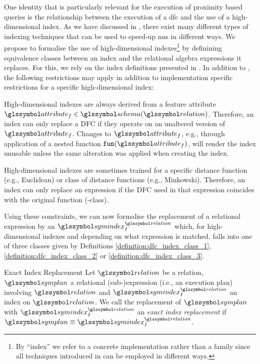 One identity that is particularly relevant for the execution of proximity based queries is the relationship between the execution of a \acrshort{dfc} and the use of a high-dimensional index. As we have discussed in , there exist many different types of indexing techniques that can be used to speed-up \acrshort{nns} in different ways. We propose to formalise the use of high-dimensional indexes\footnote{By ``index'' we refer to a concrete implementation rather than a family since all techniques introduced in  can be employed in different ways.} by definining equivalence classes between an index and the relational algebra expressions it replaces. For this, we rely on the index definitions presented in . In addition to , the following restrictions may apply in addition to implementation specific restrictions for a specific high-dimensional index: 
\begin{enumerate*}[label=(\roman*)]
    \item High-dimensional indexes are always derived from a feature attribute $\attribute_f \in \schema(\relation)$. Therefore, an index can only replace a DFC if they operate on an unaltered version of $\attribute_f$. Changes to $\attribute_f$, e.g., through application of a nested function $\mathtt{fun}(\attribute_f)$, will render the index unusable unless the same alteration was applied when creating the index.
    \item High-dimensional indexes are sometimes trained for a specific distance function (e.g., Euclidean) or class of distance functions (e.g., Minkowski). Therefore, an index can only replace an expression if the DFC used in that expression coincides with the original function (-class).
\end{enumerate*} Using these constraints, we can now formalise the replacement of a relational expression by an $\symindex^{\relation}_{I}$ which, for high-dimensional indexes and depending on what expression is matched, falls into one of three classes given by Definitions \ref{definition:dfc_index_class_1}, \ref{definition:dfc_index_class_2} or \ref{definition:dfc_index_class_3}.

\begin{definition}[label=definition:definition:index_replacement_exact]{Exact Index Replacement}{}
    Let $\relation$ be a relation, $\symplan$ a relational (sub-)expression (i.e., an execution plan) involving $\relation$ and $\symindex^{\relation}_{I}$ an index on $\relation$. We call the replacement of $\symplan$ with $\symindex^{\relation}_{I}$ an \emph{exact index replacement} if $\symplan \equiv \symindex^{\relation}_{I}$.
\end{definition}


